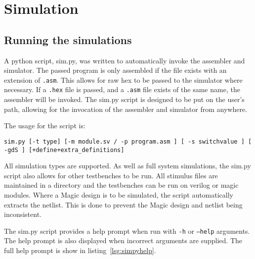 
\section{Simulation}

\subsection{Running the simulations}



A python script, sim.py, was written to automatically invoke the assembler and simulator. 
The passed program is only assembled if the file exists with an extension of \texttt{.asm}. 
This allows for raw hex to be passed to the simulator where necessary. 
If a \texttt{.hex} file is passed, and a \texttt{.asm} file exists of the same name, the assembler will be invoked. 
The sim.py script is designed to be put on the user's path, allowing for the invocation of the assembler and simulator from anywhere. 

The usage for the script is:
\begin{center}
\texttt{sim.py [-t type] [-m module.sv / -p program.asm ] [ -s switchvalue ] [ -gdS ] [+define+extra\_definitions]}
\end{center}

All simulation types are supported. 
As well as full system simulations, the sim.py script also allows for other testbenches to be run.
All stimulus files are maintained in a directory and the testbenches can be run on verilog or magic modules. 
Where a Magic design is to be simulated, the script automatically extracts the netlist. 
This is done to prevent the Magic design and netlist being inconsistent. 

The sim.py script provides a help prompt when run with \texttt{-h} or \texttt{--help} arguments. 
The help prompt is also displayed when incorrect arguments are supplied. 
The full help prompt is show in listing~\ref{lsg:simpyhelp}. 

